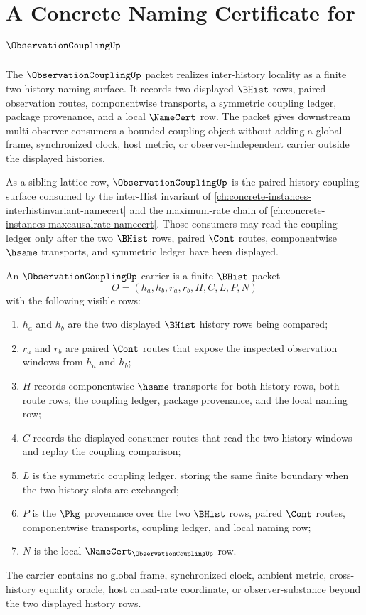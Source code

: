 \chapter{A Concrete Naming Certificate for $\ObservationCouplingUp$}
\label{ch:concrete-instances-observationcoupling-namecert}

The $\ObservationCouplingUp$ packet realizes inter-history locality as a finite two-history naming surface. It records two displayed $\BHist$ rows, paired observation routes, componentwise transports, a symmetric coupling ledger, package provenance, and a local $\NameCert$ row. The packet gives downstream multi-observer consumers a bounded coupling object without adding a global frame, synchronized clock, host metric, or observer-independent carrier outside the displayed histories.

As a sibling lattice row, $\ObservationCouplingUp$ is the paired-history coupling surface consumed by the inter-Hist invariant of \autoref{ch:concrete-instances-interhistinvariant-namecert} and the maximum-rate chain of \autoref{ch:concrete-instances-maxcausalrate-namecert}. Those consumers may read the coupling ledger only after the two $\BHist$ rows, paired $\Cont$ routes, componentwise $\hsame$ transports, and symmetric ledger have been displayed.

\begin{definition}
\label{def:observation-coupling-carrier}
An $\ObservationCouplingUp$ carrier is a finite $\BHist$ packet
$$
O=(h_a,h_b,r_a,r_b,H,C,L,P,N)
$$
with the following visible rows:
\begin{enumerate}
\item $h_a$ and $h_b$ are the two displayed $\BHist$ history rows being compared;
\item $r_a$ and $r_b$ are paired $\Cont$ routes that expose the inspected observation windows from $h_a$ and $h_b$;
\item $H$ records componentwise $\hsame$ transports for both history rows, both route rows, the coupling ledger, package provenance, and the local naming row;
\item $C$ records the displayed consumer routes that read the two history windows and replay the coupling comparison;
\item $L$ is the symmetric coupling ledger, storing the same finite boundary when the two history slots are exchanged;
\item $P$ is the $\Pkg$ provenance over the two $\BHist$ rows, paired $\Cont$ routes, componentwise transports, coupling ledger, and local naming row;
\item $N$ is the local $\NameCert_{\ObservationCouplingUp}$ row.
\end{enumerate}
The carrier contains no global frame, synchronized clock, ambient metric, cross-history equality oracle, host causal-rate coordinate, or observer-substance beyond the two displayed history rows.
\end{definition}

